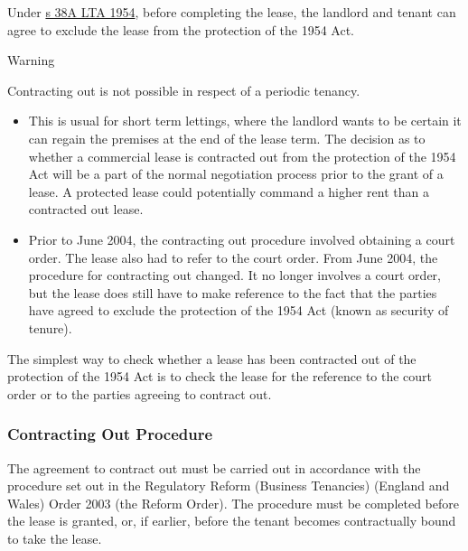\documentclass[
]{article}
\providecommand{\tightlist}{%
  \setlength{\itemsep}{0pt}\setlength{\parskip}{0pt}}
\newenvironment{env-1183acc6-7dc8-44d4-a985-6dec306e67fd}
{
    \savenotes\tcolorbox[blanker,breakable,left=5pt,borderline west={2pt}{-4pt}{orange}]
}
{
    \endtcolorbox\spewnotes
}
\begin{document}
Under
\href{https://www.legislation.gov.uk/ukpga/Eliz2/2-3/56/section/38A}{s
38A LTA 1954}, before completing the lease, the landlord and tenant can
agree to exclude the lease from the protection of the 1954 Act.

\begin{env-1183acc6-7dc8-44d4-a985-6dec306e67fd}

Warning

Contracting out is not possible in respect of a periodic tenancy.

\end{env-1183acc6-7dc8-44d4-a985-6dec306e67fd}

\begin{itemize}
\tightlist
\item
  This is usual for short term lettings, where the landlord wants to be
  certain it can regain the premises at the end of the lease term. The
  decision as to whether a commercial lease is contracted out from the
  protection of the 1954 Act will be a part of the normal negotiation
  process prior to the grant of a lease. A protected lease could
  potentially command a higher rent than a contracted out lease.
\item
  Prior to June 2004, the contracting out procedure involved obtaining a
  court order. The lease also had to refer to the court order. From June
  2004, the procedure for contracting out changed. It no longer involves
  a court order, but the lease does still have to make reference to the
  fact that the parties have agreed to exclude the protection of the
  1954 Act (known as security of tenure).
\end{itemize}

The simplest way to check whether a lease has been contracted out of the
protection of the 1954 Act is to check the lease for the reference to
the court order or to the parties agreeing to contract out.

\hypertarget{contracting-out-procedure}{%
\subsubsection{Contracting Out
Procedure}\label{contracting-out-procedure}}

The agreement to contract out must be carried out in accordance with the
procedure set out in the Regulatory Reform (Business Tenancies) (England
and Wales) Order 2003 (the Reform Order). The procedure must be
completed before the lease is granted, or, if earlier, before the tenant
becomes contractually bound to take the lease.
\end{document}
